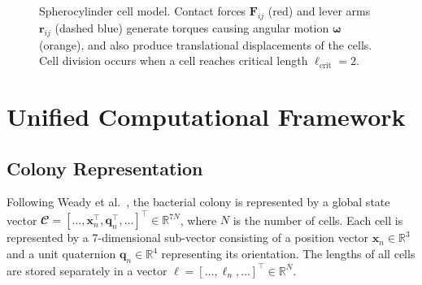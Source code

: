 \documentclass[conference]{IEEEtran}
\begin{document}
\begin{figure}[H]
    \caption{Spherocylinder cell model. Contact forces $\mathbf{F}_{ij}$ (red) and lever arms $\mathbf{r}_{ij}$ (dashed blue) generate torques causing angular motion $\boldsymbol{\omega}$ (orange), and also produce translational displacements of the cells. Cell division occurs when a cell reaches critical length $\ell_{\text{crit}} = 2$.}
    \label{fig:spherocylinder_model}

\end{figure}

\newpage

\section{Unified Computational Framework}

\subsection{Colony Representation}

Following Weady et al.~\cite{Weady2024SM}, the bacterial colony is represented by a global state vector $\mathbfcal{C} = [\dots, \mathbf{x}_n^\top, \mathbf{q}_n^\top, \dots]^\top \in \mathbb{R}^{7N}$, where $N$ is the number of cells. Each cell is represented by a 7-dimensional sub-vector consisting of a position vector $\mathbf{x}_n \in \mathbb{R}^3$ and a unit quaternion $\mathbf{q}_n \in \mathbb{R}^4$ representing its orientation. The lengths of all cells are stored separately in a vector $\boldsymbol{\ell} = [\dots, \ell_n, \dots]^\top \in \mathbb{R}^{N}$.
\end{document}
